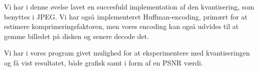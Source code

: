 Vi har i denne øvelse lavet en succesfuld implementation af den kvantisering, som benyttes i JPEG. Vi har også implementeret Huffman-encoding, primært for at estimere komprimeringsfaktoren, men vores encoding kan også udvides til at gemme billedet på disken og senere decode det.

Vi har i vores program givet mulighed for at eksperimentere med kvantiseringen og få vist resultatet, både grafisk samt i form af en PSNR værdi.

